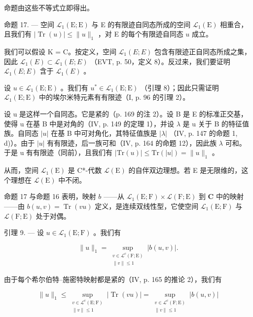 命题由这些不等式立即得出。

命题 17. — 空间 \(\mathcal{L}_{1}(\mathrm{E};\mathrm{E})\) 与 E 的有限迹自同态所成的空间 \(\mathcal{L}_{1}(\mathrm{E})\) 相重合，且我们有 \(|\operatorname{Tr}(u)|\leqslant \| u\|_{1}\) ，对 E 的每个有限迹自同态 \(u\) 成立。

我们可以假设 K = C。按定义，空间 \(\mathcal{L}_{1}(E;E)\) 包含有限迹正自同态所成之集，因此 \(\mathcal{L}_{1}(E)\subset\mathcal{L}_{1}(E;E)\) （EVT, p. 50，定义 8）。反过来，我们要证明 \(\mathcal{L}_{1}(E;E)\) 含于 \(\mathcal{L}_{1}(E)\) 。

设 \(u \in \mathcal{L}_{1}(\mathrm{E};\mathrm{E})\) 。我们有 \(u^{*} \in \mathcal{L}_{1}(\mathrm{E};\mathrm{E})\) （引理 8）；因此只需证明 \(\mathcal{L}_{1}(\mathrm{E};\mathrm{E})\) 中的埃尔米特元素有有限迹（I, p. 96 的引理 2）。

设 u 是这样一个自同态。它是紧的（p. 169 的注 2）。设 B 是 E 的标准正交基，使得 u 在基 B 中是对角的（IV, p. 149 的定理 1），并设 \(\lambda\) 是 u 关于 B 的特征值族。自同态 \(|u|\) 在基 B 中可对角化，其特征值族是 \(|\lambda|\) （IV, p. 147 的命题 1, d)）。由于 \(|u|\) 有有限迹，后一族可和（IV, p. 164 的命题 12），因此族 \(\lambda\) 可和。于是 u 有有限迹（同前），且我们有 \(|\mathrm{Tr}(u)| \leqslant \mathrm{Tr}(|u|) = \|u\|_{1}\) 。

从而，空间 \(\mathcal{L}_{1}(\mathrm{E})\) 是 C*-代数 \(\mathcal{L}(\mathrm{E})\) 的自伴双边理想。若 E 是无限维的，这个理想在 \(\mathcal{L}(\mathrm{E})\) 中不闭。

命题 17 与命题 16 表明，映射 \(b\) ——从 \(\mathcal{L}_1(\mathrm{E};\mathrm{F})\times \mathcal{L}(\mathrm{F};\mathrm{E})\) 到 \(\mathbf{C}\) 中的映射——由 \(b(u,v) = \operatorname {Tr}(vu)\) 定义，是连续双线性型，它使空间 \(\mathcal{L}_1(\mathrm{E};\mathrm{F})\) 与 \(\mathcal{L}(\mathrm{F};\mathrm{E})\) 处于对偶。

引理 9. --- 设 \(u \in \mathcal{L}_1(\mathrm{E};\mathrm{F})\) 。我们有

\[
\| u\|_{1} = \sup_{\substack{v\in \mathcal{L}^{c}(\mathrm{F};\mathrm{E})\\ \| v\| \leqslant 1}}|b(u,v)|.
\]

由于每个希尔伯特--施密特映射都是紧的（IV, p. 165 的推论 2），我们有

\[
\| u\|_{1}\leqslant \sup_{\substack{v\in \mathcal{L}^{\mathrm{c}}(\mathrm{E};\mathrm{F})\\ \| v\| \leqslant 1}}|\operatorname{Tr}(vu)| = \sup_{\substack{v\in \mathcal{L}^{\mathrm{c}}(\mathrm{F};\mathrm{E})\\ \| v\| \leqslant 1}}|b(u,v)|
\]

